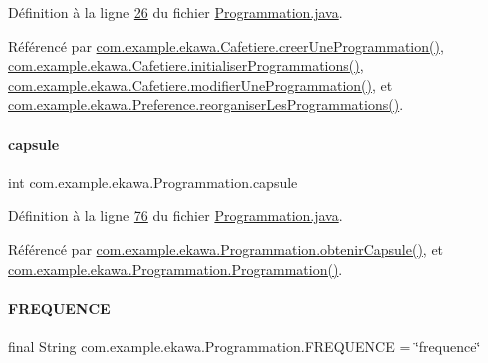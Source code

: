 Définition à la ligne \hyperlink{_programmation_8java_source_l00026}{26} du fichier \hyperlink{_programmation_8java_source}{Programmation.\+java}.



Référencé par \hyperlink{_cafetiere_8java_source_l00731}{com.\+example.\+ekawa.\+Cafetiere.\+creer\+Une\+Programmation()}, \hyperlink{_cafetiere_8java_source_l00692}{com.\+example.\+ekawa.\+Cafetiere.\+initialiser\+Programmations()}, \hyperlink{_cafetiere_8java_source_l00775}{com.\+example.\+ekawa.\+Cafetiere.\+modifier\+Une\+Programmation()}, et \hyperlink{_preference_8java_source_l00157}{com.\+example.\+ekawa.\+Preference.\+reorganiser\+Les\+Programmations()}.

\mbox{\label{classcom_1_1example_1_1ekawa_1_1_programmation_a97573a66f9b2821a7445c69f346a5298}} 
\paragraph{\texorpdfstring{capsule}{capsule}}
{\footnotesize\ttfamily int com.\+example.\+ekawa.\+Programmation.\+capsule\hspace{0.3cm}{\ttfamily [private]}}



Définition à la ligne \hyperlink{_programmation_8java_source_l00076}{76} du fichier \hyperlink{_programmation_8java_source}{Programmation.\+java}.



Référencé par \hyperlink{_programmation_8java_source_l00124}{com.\+example.\+ekawa.\+Programmation.\+obtenir\+Capsule()}, et \hyperlink{_programmation_8java_source_l00091}{com.\+example.\+ekawa.\+Programmation.\+Programmation()}.

\mbox{\label{classcom_1_1example_1_1ekawa_1_1_programmation_aa5b1e7bbc58f4fef972e733498781a8e}} 
\paragraph{\texorpdfstring{F\+R\+E\+Q\+U\+E\+N\+CE}{FREQUENCE}}
{\footnotesize\ttfamily final String com.\+example.\+ekawa.\+Programmation.\+F\+R\+E\+Q\+U\+E\+N\+CE = \char`\"{}frequence\char`\"{}\hspace{0.3cm}{\ttfamily [static]}}



